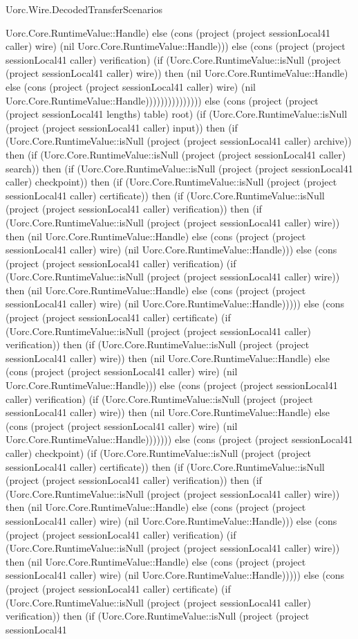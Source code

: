 \begin{lexlean}{Uorc.Wire.DecodedTransferScenarios}
\begin{semanticmodule}
{Uorc.Core.RuntimeValue::Handle) else (cons (project (project sessionLocal41 caller) wire) (nil Uorc.Core.RuntimeValue::Handle))) else (cons (project (project sessionLocal41 caller) verification) (if (Uorc.Core.RuntimeValue::isNull (project (project sessionLocal41 caller) wire)) then (nil Uorc.Core.RuntimeValue::Handle) else (cons (project (project sessionLocal41 caller) wire) (nil Uorc.Core.RuntimeValue::Handle))))))))))))))) else (cons (project (project (project sessionLocal41 lengths) table) root) (if (Uorc.Core.RuntimeValue::isNull (project (project sessionLocal41 caller) input)) then (if (Uorc.Core.RuntimeValue::isNull (project (project sessionLocal41 caller) archive)) then (if (Uorc.Core.RuntimeValue::isNull (project (project sessionLocal41 caller) search)) then (if (Uorc.Core.RuntimeValue::isNull (project (project sessionLocal41 caller) checkpoint)) then (if (Uorc.Core.RuntimeValue::isNull (project (project sessionLocal41 caller) certificate)) then (if (Uorc.Core.RuntimeValue::isNull (project (project sessionLocal41 caller) verification)) then (if (Uorc.Core.RuntimeValue::isNull (project (project sessionLocal41 caller) wire)) then (nil Uorc.Core.RuntimeValue::Handle) else (cons (project (project sessionLocal41 caller) wire) (nil Uorc.Core.RuntimeValue::Handle))) else (cons (project (project sessionLocal41 caller) verification) (if (Uorc.Core.RuntimeValue::isNull (project (project sessionLocal41 caller) wire)) then (nil Uorc.Core.RuntimeValue::Handle) else (cons (project (project sessionLocal41 caller) wire) (nil Uorc.Core.RuntimeValue::Handle))))) else (cons (project (project sessionLocal41 caller) certificate) (if (Uorc.Core.RuntimeValue::isNull (project (project sessionLocal41 caller) verification)) then (if (Uorc.Core.RuntimeValue::isNull (project (project sessionLocal41 caller) wire)) then (nil Uorc.Core.RuntimeValue::Handle) else (cons (project (project sessionLocal41 caller) wire) (nil Uorc.Core.RuntimeValue::Handle))) else (cons (project (project sessionLocal41 caller) verification) (if (Uorc.Core.RuntimeValue::isNull (project (project sessionLocal41 caller) wire)) then (nil Uorc.Core.RuntimeValue::Handle) else (cons (project (project sessionLocal41 caller) wire) (nil Uorc.Core.RuntimeValue::Handle))))))) else (cons (project (project sessionLocal41 caller) checkpoint) (if (Uorc.Core.RuntimeValue::isNull (project (project sessionLocal41 caller) certificate)) then (if (Uorc.Core.RuntimeValue::isNull (project (project sessionLocal41 caller) verification)) then (if (Uorc.Core.RuntimeValue::isNull (project (project sessionLocal41 caller) wire)) then (nil Uorc.Core.RuntimeValue::Handle) else (cons (project (project sessionLocal41 caller) wire) (nil Uorc.Core.RuntimeValue::Handle))) else (cons (project (project sessionLocal41 caller) verification) (if (Uorc.Core.RuntimeValue::isNull (project (project sessionLocal41 caller) wire)) then (nil Uorc.Core.RuntimeValue::Handle) else (cons (project (project sessionLocal41 caller) wire) (nil Uorc.Core.RuntimeValue::Handle))))) else (cons (project (project sessionLocal41 caller) certificate) (if (Uorc.Core.RuntimeValue::isNull (project (project sessionLocal41 caller) verification)) then (if (Uorc.Core.RuntimeValue::isNull (project (project sessionLocal41 }
\end{semanticmodule}
\end{lexlean}
